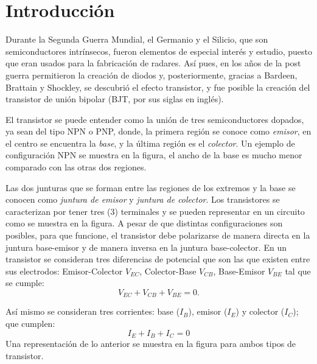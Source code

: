 \section{Introducción}
Durante la Segunda Guerra Mundial, el Germanio y el Silicio, que son semiconductores intrínsecos, fueron elementos de especial interés y estudio, puesto que eran usados para la fabricación de radares. Así pues, en los años de la post guerra permitieron la creación de diodos y, posteriormente, gracias a Bardeen, Brattain y Shockley, se descubrió el efecto transistor, y fue posible la creación del transistor de unión bipolar (BJT, por sus siglas en inglés).\cite{jackson}

El transistor se puede entender como la unión de tres semiconductores dopados, ya sean del tipo NPN o PNP, donde,  la primera región se conoce como \textit{emisor}, en el centro se encuentra la \textit{base}, y la última región es el \textit{colector}. Un ejemplo de configuración NPN se muestra en la figura, el ancho de la base es mucho menor comparado con las otras dos regiones.

Las dos junturas que se forman entre las regiones de los extremos y la base se conocen como \textit{juntura de emisor} y \textit{juntura de colector}. Los transistores se caracterizan por tener tres (3) terminales y se pueden representar en un circuito como se muestra en la figura. A pesar de que distintas configuraciones son posibles, para que funcione, el transistor debe polarizarse de manera directa en la juntura base-emisor y de manera inversa en la juntura base-colector.
En un transistor se consideran tres diferencias de potencial que son las que existen entre sus electrodos: Emisor-Colector $V_{EC}$, Colector-Base $V_{CB}$, Base-Emisor $V_{BE}$ tal que se cumple:
\begin{equation}
    V_{EC}+V_{CB}+V_{BE} = 0.
\end{equation}

Así mismo se consideran tres corrientes: base ($I_{B}$), emisor ($I_{E}$) y colector ($I_{C}$); que cumplen:
\begin{equation}
    I_{E}+I_{B}+I_{C} = 0
\end{equation}
Una representación de lo anterior se muestra en la figura para ambos tipos de transistor.

